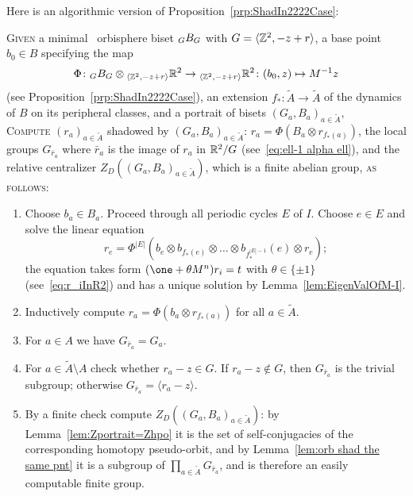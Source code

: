 \documentclass{amsart}
\newcommand\wtA{{\widetilde A}}
\begin{document}
\noindent Here is an algorithmic version of
Proposition~\ref{prp:ShadIn2222Case}:
\begin{algo}\label{algo:shadowing}
   \textsc{Given} a minimal \Tor\ orbisphere biset $\subscript G B_G$ with $G=\langle {\mathbb Z}^2,-z+r \rangle$, a base point $b_0\in B$ specifying the map
  \begin{equation}
  \label{eq:Phi:algo:shadowing}
   \Phi\colon\subscript G B_G\otimes\subscript{\langle \Z^2,-z+r \rangle}{\R^2}\to\subscript{\langle \Z^2,-z+r \rangle}{\R^2}\colon(b_0, z)\mapsto M^{-1}z
  \end{equation}
  (see Proposition~\ref{prp:ShadIn2222Case}), an extension $f_*\colon\wtA\to\wtA$ of the dynamics of $B$ on its peripheral classes, and a portrait of bisets $(G_a,B_a)_{a\in\wtA}$,\\
  \textsc{Compute} $(r_a)_{ a\in \wtA}$ shadowed by  $(G_a,B_a)_{a\in\wtA}$: $r_a= \Phi(B_a \otimes r_{f_*(a)})$, the local groups $G_{\bar r_a}$ where $\bar r_a$ is the image of $r_a$ in ${\mathbb R}^2/G$ (see~\eqref{eq:ell-1 alpha ell}), and the relative centralizer $Z_D((G_a,B_a)_{a\in\wtA})$, which is a finite
  abelian group, \textsc{as follows:}\\\upshape
   \begin{enumerate}
   \item Choose $b_a\in B_a$. Proceed through all periodic cycles $E$ of
    $I$. Choose $e\in E$ and solve the linear equation
    \[r_e =\Phi ^{|E|}\left(b_e\otimes b_{f_*(e)}\otimes \dots\otimes
        b_{f_*^{|E|-1}}(e) \otimes r_e\right);
    \]
    the equation takes form $ (\one+\theta M^n) r_i = t$ with
    $\theta\in\{\pm1\}$ (see~\eqref{eq:r_iInR2}) and has a unique
    solution by Lemma~\ref{lem:EigenValOfM-I}.
  \item Inductively compute $r_a=\Phi(b_a\otimes r_{f_*(a)})$ for all
    $a\in \wtA$.
  \item For $a\in A$ we have $G_{\bar r_a}=G_{a}$.
  \item For $a\in\wtA\setminus A$ check whether $r_a-z\in
    G$. If $r_a-z\not \in G$, then $G_{\bar r_a}$ is the trivial
    subgroup; otherwise $G_{\bar r_a}=\langle r_a-z\rangle$.
  \item By a finite check compute $Z_D((G_a,B_a)_{a\in\wtA})$:
    by Lemma~\ref{lem:Zportrait=Zhpo} it is the set of
    self-conjugacies of the corresponding homotopy pseudo-orbit, and
    by Lemma~\ref{lem:orb shad the same pnt} it is a subgroup of
    $\prod_{a\in\wtA}G_{\bar r_a}$, and is therefore an easily
    computable finite group.
  \end{enumerate}
\end{algo}
\end{document}

